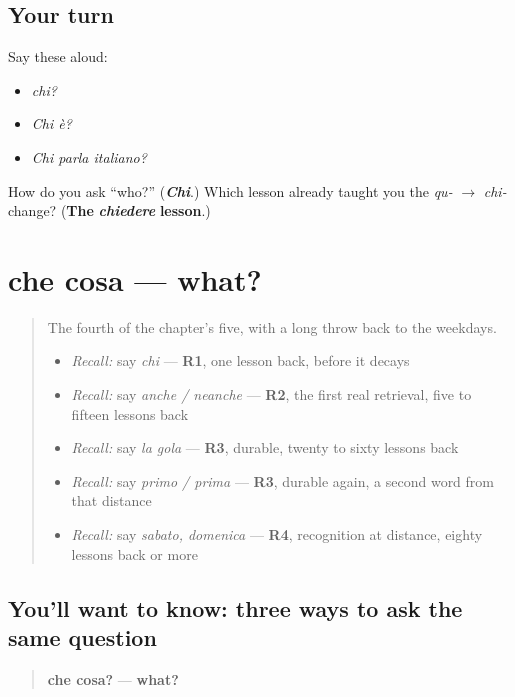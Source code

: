 \subsection*{Your turn}
Say these aloud:

\begin{itemize}
\raggedright
  \item \emph{chi?}
  \item \emph{Chi è?}
  \item \emph{Chi parla italiano?}
\end{itemize}

\begin{tcolorbox}[breakable,colback=teal!4,colframe=teal!35!black,title={Before you move on}]
How do you ask \textquotedblleft{}who?\textquotedblright{} (\emph{\textbf{Chi}}.) Which lesson already taught you the \emph{qu-} $\to$ \emph{chi-} change? (\textbf{The} \emph{\textbf{chiedere}} \textbf{lesson}.)
\end{tcolorbox}
\section[che cosa]{che cosa — what?}

\label{lesson:IT-C31-che-cosa}



\begin{quote}
The fourth of the chapter's five, with a long throw back to the weekdays.

\begin{itemize}
\raggedright
  \item \emph{Recall:} say \emph{chi} — \textbf{R1}, one lesson back, before it decays
  \item \emph{Recall:} say \emph{anche / neanche} — \textbf{R2}, the first real retrieval, five to fifteen lessons back
  \item \emph{Recall:} say \emph{la gola} — \textbf{R3}, durable, twenty to sixty lessons back
  \item \emph{Recall:} say \emph{primo / prima} — \textbf{R3}, durable again, a second word from that distance
  \item \emph{Recall:} say \emph{sabato, domenica} — \textbf{R4}, recognition at distance, eighty lessons back or more
\end{itemize}
\end{quote}

\subsection*{You'll want to know: three ways to ask the same question}
\begin{quote}
\textbf{che cosa?} — \textbf{what?}
\end{quote}

